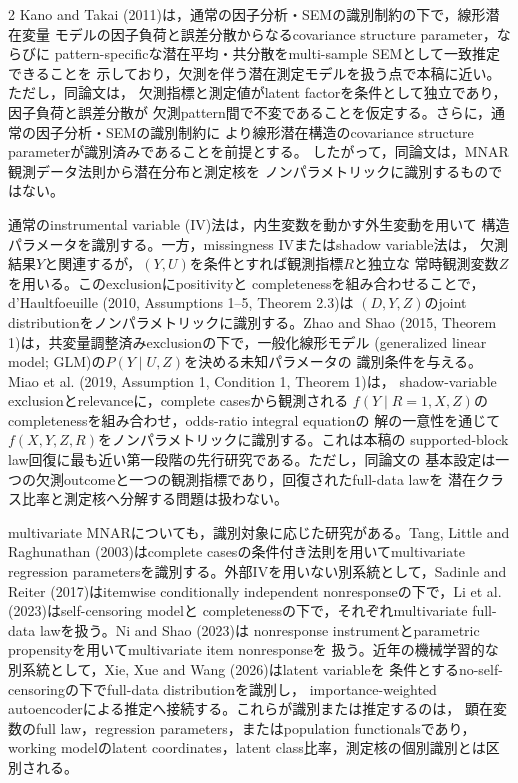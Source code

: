 \documentclass[a4paper,10pt]{article}
\begin{document}
\begin{multicols}{2}
Kano and Takai (2011)は，通常の因子分析・SEMの識別制約の下で，線形潜在変量
モデルの因子負荷と誤差分散からなるcovariance structure parameter，ならびに
pattern-specificな潜在平均・共分散をmulti-sample SEMとして一致推定できることを
示しており，欠測を伴う潜在測定モデルを扱う点で本稿に近い。ただし，同論文は，
欠測指標と測定値がlatent factorを条件として独立であり，因子負荷と誤差分散が
欠測pattern間で不変であることを仮定する。さらに，通常の因子分析・SEMの識別制約に
より線形潜在構造のcovariance structure parameterが識別済みであることを前提とする。
したがって，同論文は，MNAR観測データ法則から潜在分布と測定核を
ノンパラメトリックに識別するものではない。

通常のinstrumental variable (IV)法は，内生変数を動かす外生変動を用いて
構造パラメータを識別する。一方，missingness IVまたはshadow variable法は，
欠測結果$Y$と関連するが，$(Y,U)$を条件とすれば観測指標$R$と独立な
常時観測変数$Z$を用いる。このexclusionにpositivityと
completenessを組み合わせることで，d'Haultfoeuille
(2010, Assumptions 1--5, Theorem 2.3)は
$(D,Y,Z)$のjoint distributionをノンパラメトリックに識別する。Zhao and Shao
(2015, Theorem 1)は，共変量調整済みexclusionの下で，一般化線形モデル
(generalized linear model; GLM)の$P(Y\mid U,Z)$を決める未知パラメータの
識別条件を与える。Miao et al. (2019, Assumption 1, Condition 1, Theorem 1)は，
shadow-variable exclusionとrelevanceに，complete casesから観測される
$f(Y\mid R=1,X,Z)$のcompletenessを組み合わせ，odds-ratio integral equationの
解の一意性を通じて$f(X,Y,Z,R)$をノンパラメトリックに識別する。これは本稿の
supported-block law回復に最も近い第一段階の先行研究である。ただし，同論文の
基本設定は一つの欠測outcomeと一つの観測指標であり，回復されたfull-data lawを
潜在クラス比率と測定核へ分解する問題は扱わない。

multivariate MNARについても，識別対象に応じた研究がある。Tang, Little and
Raghunathan (2003)はcomplete casesの条件付き法則を用いてmultivariate regression
parametersを識別する。外部IVを用いない別系統として，Sadinle and Reiter (2017)はitemwise
conditionally independent nonresponseの下で，Li et al. (2023)はself-censoring modelと
completenessの下で，それぞれmultivariate full-data lawを扱う。Ni and Shao (2023)は
nonresponse instrumentとparametric propensityを用いてmultivariate item nonresponseを
扱う。近年の機械学習的な別系統として，Xie, Xue and Wang (2026)はlatent variableを
条件とするno-self-censoringの下でfull-data distributionを識別し，
importance-weighted autoencoderによる推定へ接続する。これらが識別または推定するのは，
顕在変数のfull law，regression parameters，またはpopulation functionalsであり，
working modelのlatent coordinates，latent class比率，測定核の個別識別とは区別される。


\end{multicols}
\end{document}
